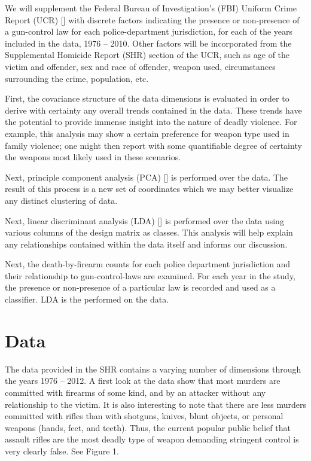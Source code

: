 \documentclass{evanarticle}
\begin{document}
We will supplement the Federal Bureau of Investigation's (FBI) Uniform Crime Report (UCR) [\cite{shr}] with discrete factors indicating the presence or non-presence of a gun-control law for each police-department jurisdiction, for each of the years included in the data, 1976 -- 2010.  Other factors will be incorporated from the Supplemental Homicide Report (SHR) section of the UCR, such as age of the victim and offender, sex and race of offender, weapon used, circumstances surrounding the crime, population, etc.

First, the covariance structure of the data dimensions is evaluated in order to derive with certainty any overall trends contained in the data.  These trends have the potential to provide immense insight into the nature of deadly violence.  For example, this analysis may show a certain preference for weapon type used in family violence;  one might then report with some quantifiable degree of certainty the weapons most likely used in these scenarios.

Next, principle component analysis (PCA) [\cite{sergios}] is performed over the data.  The result of this process is a new set of coordinates which we may better visualize any distinct clustering of data.

Next, linear discriminant analysis (LDA) [\cite{sergios}] is performed over the data using various columns of the design matrix as classes.  This analysis will help explain any relationships contained within the data itself and informs our discussion.

Next, the death-by-firearm counts for each police department jurisdiction and their relationship to gun-control-laws are examined.  For each year in the study, the presence or non-presence of a particular law is recorded and used as a classifier.  LDA is the performed on the data.

\section{Data}

The data provided in the SHR contains a varying number of dimensions through the years 1976 -- 2012.  A first look at the data show that most murders are committed with firearms of some kind, and by an attacker without any relationship to the victim.  It is also interesting to note that there are less murders committed with rifles than with shotguns, knives, blunt objects, or personal weapons (hands, feet, and teeth).  Thus, the current popular public belief that assault rifles are the most deadly type of weapon demanding stringent control is very clearly false.  See Figure 1.
\end{document}
